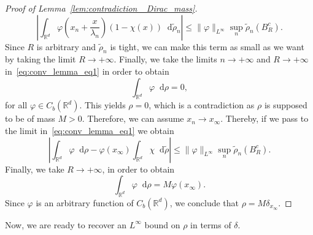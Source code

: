 \documentclass[11pt,a4paper]{article}
\numberwithin{equation}{section}
\newcommand{\R}{{\mathbb{R}}}
\theoremstyle{plain}
\theoremstyle{remark}
\newcommand {\f}{\frac}
\newcommand{\diff}{\mathop{}\!\mathrm{d}}
\begin{document}
\begin{proof}[Proof of Lemma~\ref{lem:contradiction_ Dirac_mass}]
$$
\left|\int_{\R^d}\varphi\left(x_n + \f{x}{\lambda_n}\right) (1-\chi(x))\diff \tilde{\rho}_n\right| \le \|\varphi\|_{L^{\infty}} \sup_{n}\tilde{\rho}_n(B_{R}^c).
$$
Since $R$ is arbitrary and $\tilde{\rho}_n$ is tight, we can make this term as small as we want by taking the limit $R\to +\infty$.  Finally, we take the limits $n\to+\infty$ and $R\to +\infty$ in~\eqref{eq:conv_lemma_eq1} in order to obtain
$$
\int_{\R^d}\varphi\diff \rho = 0,
$$
for all $\varphi\in C_{b}(\R^d)$. This yields $\rho=0$, which is a contradiction as $\rho$ is supposed to be of mass $M>0$. 
Therefore, we can assume $x_n\to x_{\infty}$. Thereby, if we pass to the limit in~\eqref{eq:conv_lemma_eq1} we obtain
$$
\left|\int_{\R^d}\varphi\diff \rho - \varphi(x_\infty) \int_{\R^d}\chi \diff \tilde{\rho}\right|\le \|\varphi\|_{L^{\infty}}\sup_{n}\tilde{\rho}_{n}(B_{R}^c).
$$
Finally, we take $R\to+\infty$, in order to obtain  
$$
    \int_{\R^d}\varphi \diff \rho = M\varphi(x_\infty). 
$$
Since $\varphi$ is an arbitrary function of $C_{b}(\R^d)$, we conclude that $\rho = M \delta_{x_{\infty}}.$
\end{proof}

Now, we are ready to recover an $L^\infty$ bound on $\rho$ in terms of $\delta$.
\end{document}
